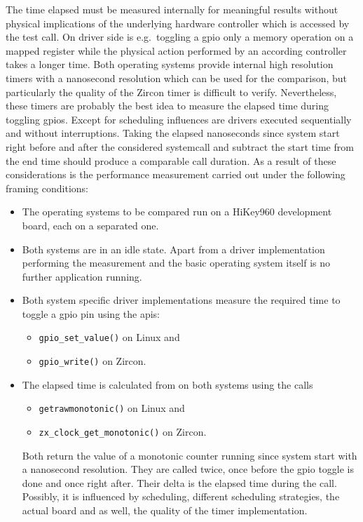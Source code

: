 The time elapsed must be measured internally for meaningful results without physical implications of the underlying hardware controller which is accessed by the test call.
On driver side is e.g.\ toggling a \ac{gpio} only a memory operation on a mapped register while the physical action performed by an according controller takes a longer time.
Both operating systems provide internal high resolution timers with a nanosecond resolution which can be used for the comparison, but particularly the quality of the Zircon timer is difficult to verify.
Nevertheless, these timers are probably the best idea to measure the elapsed time during toggling \acp{gpio}.
Except for scheduling influences are drivers executed sequentially and without interruptions.
Taking the elapsed nanoseconds since system start right before and after the considered systemcall and subtract the start time from the end time should produce a comparable call duration.
\newpage
As a result of these considerations is the performance measurement carried out under the following framing conditions:
\begin{itemize}
    \item The operating systems to be compared run on a HiKey960 development board, each on a separated one.
    \item Both systems are in an idle state. Apart from a driver implementation performing the measurement and the basic operating system itself is no further application running.
    \item Both system specific driver implementations measure the required time to toggle a \ac{gpio} pin using the \acp{api}:
        \begin{itemize}
            \item \texttt{gpio_set_value()} on Linux and
            \item \texttt{gpio_write()} on Zircon.
        \end{itemize}
    \item The elapsed time is calculated from on both systems using the calls
        \begin{itemize}
            \item \texttt{getrawmonotonic()} on Linux and
            \item \texttt{zx_clock_get_monotonic()} on Zircon.
        \end{itemize}
        Both return the value of a monotonic counter running since system start with a nanosecond resolution.
        They are called twice, once before the \ac{gpio} toggle is done and once right after.
        Their delta is the elapsed time during the call.
        Possibly, it is influenced by scheduling, different scheduling strategies, the actual board and as well, the quality of the timer implementation.
\end{itemize}

